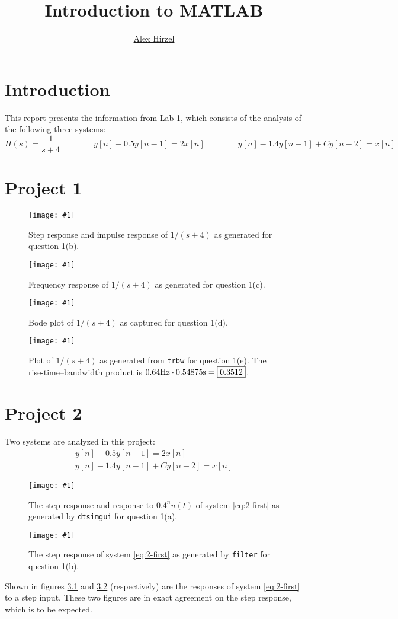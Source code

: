 \documentclass{ajhlabreport}
\title{Introduction to MATLAB}
\author{\href{mailto:ahirzel@mtu.edu}{Alex Hirzel}}
\newcommand{\savedfig}[2]{
	\begin{figure}[H]
	\centering
	\texttt{[image: \#1]}
	\caption{#2}
	\end{figure}
}
\newcommand{\savedhardcopy}[2]{
	\begin{figure}[H]
	\centering
	\texttt{[image: \#1]}
	\caption{#2}
	\end{figure}
}
\begin{document}

\cleardoublepage

\maketitle

\chapter{Introduction}

This report presents the information from Lab 1, which consists of the analysis
of the following three systems:
\[
H(s) = \frac{1}{s+4}
\qquad\qquad
y[n]-0.5y[n-1]=2x[n]
\qquad\qquad
y[n]-1.4y[n-1]+C y[n-2]=x[n]
\]

\chapter{Project 1}

\savedfig{p1_step_impulse.png}{Step response and impulse response of $1/(s+4)$ as generated for question 1(b).\label{fig:step-impulse}}
\savedfig{p1_frequency.png}{Frequency response of $1/(s+4)$ as generated for question 1(c).\label{fig:frequency}}
\savedhardcopy{p1_bode.pdf}{Bode plot of $1/(s+4)$ as captured for question 1(d).\label{fig:bode}}
\savedfig{p1_rise_time.png}{Plot of $1/(s+4)$ as generated from \texttt{trbw} for question 1(e). The rise-time--bandwidth product is $0.64\hertz \cdot 0.54875\second = \boxed{0.3512}$.\label{fig:rise-time}}

\chapter{Project 2}

Two systems are analyzed in this project:
\begin{align}
y[n]-0.5y[n-1]=2x[n] \label{eq:2-first}\\
y[n]-1.4y[n-1]+C y[n-2]=x[n] \label{eq:2-second}
\end{align}

\savedfig{p2_1_responses.png}{The step response and response to $0.4^n u(t)$ of system \eqref{eq:2-first} as generated by \texttt{dtsimgui} for question 1(a).\label{fig:21-dtsimgui-responses}}
\savedfig{p2_1_filter_response.png}{The step response of system \eqref{eq:2-first} as generated by \texttt{filter} for question 1(b).\label{fig:21-filter-response}}

Shown in figures \ref{fig:21-dtsimgui-responses} and
\ref{fig:21-filter-response} (respectively) are the responses of system
\eqref{eq:2-first} to a step input. These two figures are in exact agreement on
the step response, which is to be expected.
\end{document}

